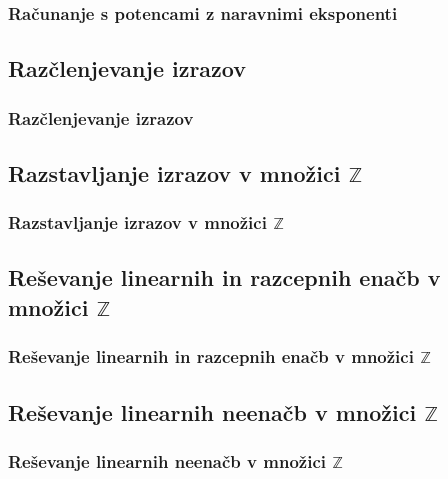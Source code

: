         \begin{frame}
            \frametitle{Računanje s potencami z naravnimi eksponenti}
        \end{frame}

    \subsection{Razčlenjevanje izrazov}

        \begin{frame}
            \frametitle{Razčlenjevanje izrazov}
        \end{frame}

    \subsection{Razstavljanje izrazov v množici $\mathbb{Z}$}

        \begin{frame}
            \frametitle{Razstavljanje izrazov v množici $\mathbb{Z}$}
        \end{frame}

    \subsection{Reševanje linearnih in razcepnih enačb v množici $\mathbb{Z}$}

        \begin{frame}
            \frametitle{Reševanje linearnih in razcepnih enačb v množici $\mathbb{Z}$}
        \end{frame}

    \subsection{Reševanje linearnih neenačb v množici $\mathbb{Z}$}

        \begin{frame}
            \frametitle{Reševanje linearnih neenačb v množici $\mathbb{Z}$}
        \end{frame}
